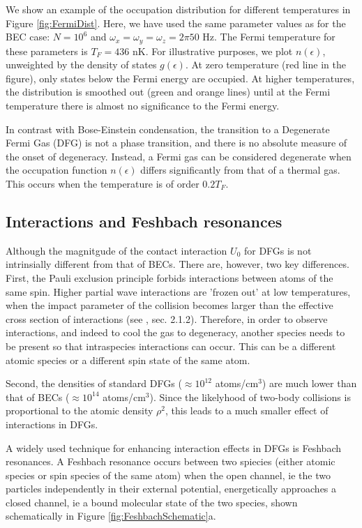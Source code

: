 We show an example of the occupation distribution for different temperatures in Figure \ref{fig:FermiDist}. Here, we have used the same parameter values as for the BEC case: $N=10^6$ and $\omega_x=\omega_y=\omega_z=2\pi 50$ Hz. The Fermi temperature for these parameters is $T_F=436$ nK.  For illustrative purposes, we plot $n(\epsilon)$, unweighted by the density of states $g(\epsilon)$. At zero temperature (red line in the figure), only states below the Fermi energy are occupied. At higher temperatures, the distribution is smoothed out (green and orange lines) until at the Fermi temperature there is almost no significance to the Fermi energy.

In contrast with Bose-Einstein condensation, the transition to a Degenerate Fermi Gas (DFG) is not a phase transition, and there is no absolute measure of the onset of degeneracy. Instead, a Fermi gas can be considered degenerate when the occupation function $n(\epsilon)$ differs significantly from that of a thermal gas. This occurs when the temperature is of order $0.2 T_F$. 

\subsection{Interactions and Feshbach resonances}\label{sec:Feshbach}
Although the magnitgude of the contact interaction $U_0$ for DFGs is not intrinsially different from that of BECs. There are, however, two key differences. First, the Pauli exclusion principle forbids \swave{} interactions between atoms of the same spin. Higher partial wave interactions are 'frozen out' at low temperatures, when the impact parameter of the collision becomes larger than the effective cross section of interactions (see \cite{KetterleDFG}, sec. 2.1.2). Therefore, in order to observe interactions, and indeed to cool the gas to degeneracy, another species needs to be present so that intraspecies \swave{} interactions can occur. This can be a different atomic species or a different spin state of the same atom. 

Second, the densities of standard DFGs ($\approx 10^{12}$ atoms/cm$^3$) are much lower than that of BECs ($\approx 10^{14}$ atoms/cm$^3$). Since the likelyhood of two-body collisions is proportional to the atomic density $\rho^2$, this leads to a much smaller effect of interactions in DFGs.

A widely used technique for enhancing interaction effects in DFGs is Feshbach resonances. A Feshbach resonance occurs between two spiecies (either atomic species or spin species of the same atom) when the open channel, ie the two particles independently in their external potential, energetically approaches a closed channel, ie a bound molecular state of the two species, shown schematically in Figure \ref{fig:FeshbachSchematic}a. 

